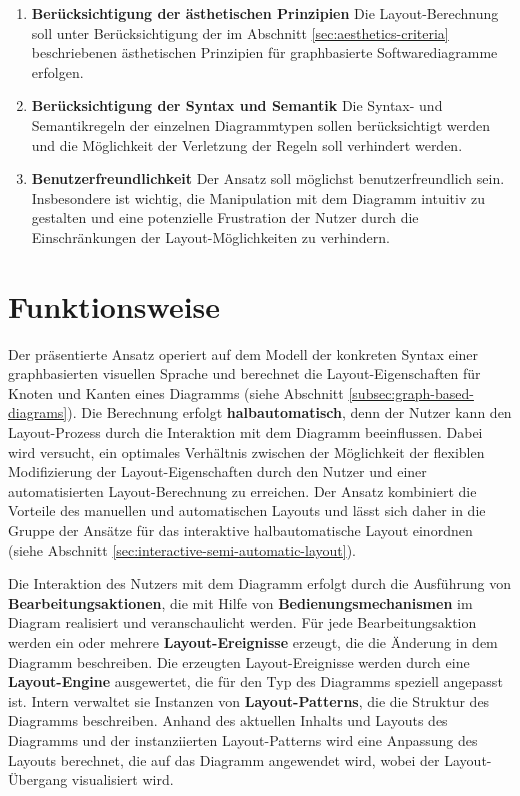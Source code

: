 \begin{enumerate}[label={K.\arabic*}]
\item
\label{req:aesthetics-criteria}
\textbf{Berücksichtigung der ästhetischen Prinzipien}
Die Layout-Berechnung soll unter Berücksichtigung der im Abschnitt \ref{sec:aesthetics-criteria} beschriebenen ästhetischen Prinzipien für graphbasierte Softwarediagramme erfolgen.

\item
\label{req:syntax-and-semantics}
\textbf{Berücksichtigung der Syntax und Semantik}
Die Syntax- und Semantikregeln der einzelnen Diagrammtypen sollen berücksichtigt werden und die Möglichkeit der Verletzung der Regeln soll verhindert werden.

\item
\label{req:user-friendly}
\textbf{Benutzerfreundlichkeit}
Der Ansatz soll möglichst benutzerfreundlich sein. Insbesondere ist wichtig, die Manipulation mit dem Diagramm intuitiv zu gestalten und eine potenzielle Frustration der Nutzer durch die Einschränkungen der Layout-Möglichkeiten zu verhindern.

\end{enumerate}


\section{Funktionsweise}
\label{sec:functionality}

Der präsentierte Ansatz operiert auf dem Modell der konkreten Syntax einer graphbasierten visuellen Sprache und berechnet die Layout-Eigenschaften für Knoten und Kanten eines Diagramms (siehe Abschnitt \ref{subsec:graph-based-diagrams}). Die Berechnung erfolgt \textbf{halbautomatisch}, denn der Nutzer kann den Layout-Prozess durch die Interaktion mit dem Diagramm beeinflussen. Dabei wird versucht, ein optimales Verhältnis zwischen der Möglichkeit der flexiblen Modifizierung der Layout-Eigenschaften durch den Nutzer und einer automatisierten Layout-Berechnung zu erreichen. Der Ansatz kombiniert die Vorteile des manuellen und automatischen Layouts und lässt sich daher in die Gruppe der Ansätze für das interaktive halbautomatische Layout einordnen (siehe Abschnitt \ref{sec:interactive-semi-automatic-layout}).

Die Interaktion des Nutzers mit dem Diagramm erfolgt durch die Ausführung von \textbf{Bearbeitungsaktionen}, die mit Hilfe von \textbf{Bedienungsmechanismen} im Diagram realisiert und veranschaulicht werden. Für jede Bearbeitungsaktion werden ein oder mehrere \textbf{Layout-Ereignisse} erzeugt, die die Änderung in dem Diagramm beschreiben. Die erzeugten Layout-Ereignisse werden durch eine \textbf{Layout-Engine} ausgewertet, die für den Typ des Diagramms speziell angepasst ist. Intern verwaltet sie Instanzen von \textbf{Layout-Patterns}, die die Struktur des Diagramms beschreiben. Anhand des aktuellen Inhalts und Layouts des Diagramms und der instanziierten Layout-Patterns wird eine Anpassung des Layouts berechnet, die auf das Diagramm angewendet wird, wobei der Layout-Übergang visualisiert wird.

